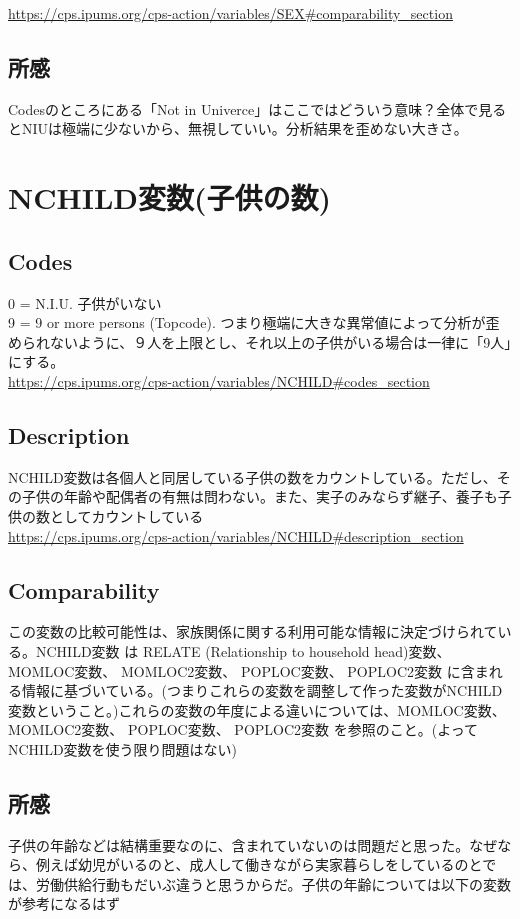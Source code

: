 \documentclass{jsarticle}
\begin{document}
\url{https://cps.ipums.org/cps-action/variables/SEX#comparability_section}

\subsection{所感}
Codesのところにある「Not in Univerce」はここではどういう意味？全体で見るとNIUは極端に少ないから、無視していい。分析結果を歪めない大きさ。

\section{NCHILD変数(子供の数)}
\subsection{Codes}
0 = N.I.U. 子供がいない\\
  
9 = 9 or more persons (Topcode). つまり極端に大きな異常値によって分析が歪められないように、９人を上限とし、それ以上の子供がいる場合は一律に「9人」にする。\\
  
\url{https://cps.ipums.org/cps-action/variables/NCHILD#codes_section}
\subsection{Description}
NCHILD変数は各個人と同居している子供の数をカウントしている。ただし、その子供の年齢や配偶者の有無は問わない。また、実子のみならず継子、養子も子供の数としてカウントしている\\
  
\url{https://cps.ipums.org/cps-action/variables/NCHILD#description_section}
\subsection{Comparability}
この変数の比較可能性は、家族関係に関する利用可能な情報に決定づけられている。NCHILD変数 は RELATE (Relationship to household head)変数、 MOMLOC変数、 MOMLOC2変数、 POPLOC変数、 POPLOC2変数 に含まれる情報に基づいている。(つまりこれらの変数を調整して作った変数がNCHILD変数ということ。)これらの変数の年度による違いについては、MOMLOC変数、 MOMLOC2変数、 POPLOC変数、 POPLOC2変数 を参照のこと。(よってNCHILD変数を使う限り問題はない)
\subsection{所感}
子供の年齢などは結構重要なのに、含まれていないのは問題だと思った。なぜなら、例えば幼児がいるのと、成人して働きながら実家暮らしをしているのとでは、労働供給行動もだいぶ違うと思うからだ。子供の年齢については以下の変数が参考になるはず\\
  
\end{document}
